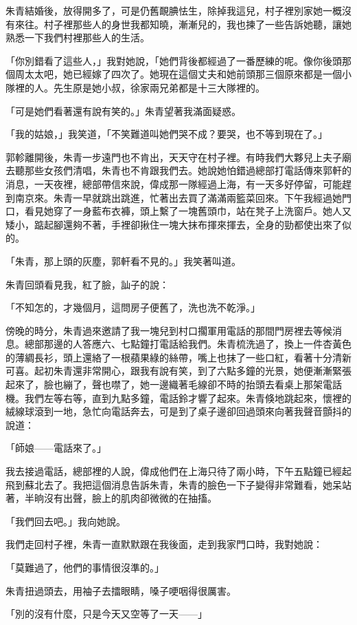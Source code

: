 朱青結婚後，放得開多了，可是仍舊靦腆怯生，除掉我這兒，村子裡別家她一概沒有來往。村子裡那些人的身世我都知曉，漸漸兒的，我也揀了一些告訴她聽，讓她熟悉一下我們村裡那些人的生活。

「你別錯看了這些人，」我對她說，「她們背後都經過了一番歷練的呢。像你後頭那個周太太吧，她已經嫁了四次了。她現在這個丈夫和她前頭那三個原來都是一個小隊裡的人。先生原是她小叔，徐家兩兄弟都是十三大隊裡的。

「可是她們看著還有說有笑的。」朱青望著我滿面疑惑。

「我的姑娘，」我笑道，「不笑難道叫她們哭不成？要哭，也不等到現在了。」

郭軫離開後，朱青一步遠門也不肯出，天天守在村子裡。有時我們大夥兒上夫子廟去聽那些女孩們清唱，朱青也不肯跟我們去。她說她怕錯過總部打電話傳來郭軒的消息，一天夜裡，總部帶信來說，偉成那一隊經過上海，有一天多好停留，可能趕到南京來。朱青一早就跳出跳進，忙著出去買了滿滿兩籃菜回來。下午我經過她門口，看見她穿了一身藍布衣褲，頭上繫了一塊舊頭巾，站在凳子上洗窗戶。她人又矮小，踮起腳還夠不著，手裡卻揪住一塊大抹布揮來揮去，全身的勁都使出來了似的。

「朱青，那上頭的灰塵，郭軒看不見的。」我笑著叫道。

朱青回頭看見我，紅了臉，訕子的說：

「不知怎的，才幾個月，這問房子便舊了，洗也洗不乾淨。」

傍晚的時分，朱青過來邀請了我一塊兒到村口擱軍用電話的那間門房裡去等候消息。總部那邊的人答應六、七點鐘打電話給我們。朱青梳洗過了，換上一件杏黃色的薄綢長衫，頭上還絡了一根蘋果綠的絲帶，嘴上也抹了一些口紅，看著十分清新可喜。起初朱青還非常開心，跟我有說有笑，到了六點多鐘的光景，她便漸漸緊張起來了，臉也繃了，聲也噤了，她一邊織著毛線卻不時的抬頭去看桌上那架電話機。我們左等右等，直到九點多鐘，電話鈴才響了起來。朱青倏地跳起來，懷裡的絨線球滾到一地，急忙向電話奔去，可是到了桌子邊卻回過頭來向著我聲音顫抖的說道：

「師娘——電話來了。」

我去接過電話，總部裡的人說，偉成他們在上海只待了兩小時，下午五點鐘已經起飛到蘇北去了。我把這個消息告訴朱青，朱青的臉色一下子變得非常難看，她呆站著，半晌沒有出聲，臉上的肌肉卻微微的在抽搐。

「我們回去吧。」我向她說。

我們走回村子裡，朱青一直默默跟在我後面，走到我家門口時，我對她說：

「莫難過了，他們的事情很沒準的。」

朱青扭過頭去，用袖子去擂眼睛，嗓子哽咽得很厲害。

「別的沒有什麼，只是今天又空等了一天——」

